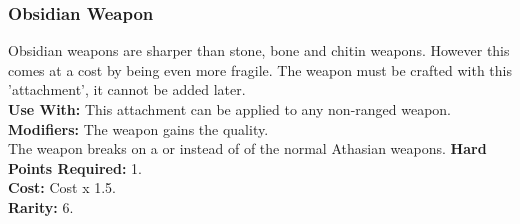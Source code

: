 \subsubsection{Obsidian Weapon}
Obsidian weapons are sharper than stone, bone and chitin weapons. However
this comes at a cost by being even more fragile. The weapon must be crafted
with this 'attachment', it cannot be added later.\\
\textbf{Use With:} This attachment can be applied to any non-ranged weapon.\\
\textbf{Modifiers:}
    The weapon gains the  quality.\\
    The weapon breaks on a \threat\threat or \despair instead of \threat\threat\threat of the normal Athasian weapons.
\textbf{Hard Points Required:} 1.\\
\textbf{Cost:} Cost x 1.5.\\
\textbf{Rarity:} 6.\\
